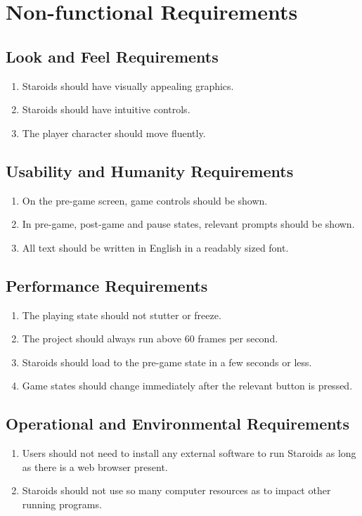 \documentclass[12pt, titlepage]{article}
\begin{document}
\section{Non-functional Requirements}

\subsection{Look and Feel Requirements}
  \begin{enumerate}
    \item Staroids should have visually appealing graphics.
    \item Staroids should have intuitive controls.
    \item The player character should move fluently.
  \end{enumerate}

\subsection{Usability and Humanity Requirements}
  \begin{enumerate}
    \item On the pre-game screen, game controls should be shown.
    \item In pre-game, post-game and pause states, relevant prompts should be shown.
    \item All text should be written in English in a readably sized font.
  \end{enumerate}

\subsection{Performance Requirements}
  \begin{enumerate}
    \item The playing state should not stutter or freeze.
    \item The project should always run above 60 frames per second.
    \item Staroids should load to the pre-game state in a few seconds or less.
    \item Game states should change immediately after the relevant button is pressed.
  \end{enumerate}

\subsection{Operational and Environmental Requirements}
  \begin{enumerate}
    \item Users should not need to install any external software to run Staroids as long as there is a web browser present.
    \item Staroids should not use so many computer resources as to impact other running programs.
  \end{enumerate}
\end{document}
